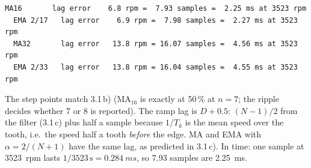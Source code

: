 \begin{solution}
\begin{lstlisting}[style=shell,numbers=none]
  MA16       lag error    6.8 rpm =  7.93 samples =  2.25 ms at 3523 rpm
  EMA 2/17   lag error    6.9 rpm =  7.98 samples =  2.27 ms at 3523 rpm
  MA32       lag error   13.8 rpm = 16.07 samples =  4.56 ms at 3523 rpm
  EMA 2/33   lag error   13.8 rpm = 16.04 samples =  4.55 ms at 3523 rpm
\end{lstlisting}
The step points match 3.1\,b) (MA$_{16}$ is exactly at 50\,\% at $n=7$; the
ripple decides whether 7 or 8 is reported). The ramp lag is
$D+0.5$: $(N-1)/2$ from the filter (3.1\,c) plus half a sample because $1/T_k$
is the mean speed over the tooth, i.e.\ the speed half a tooth \emph{before}
the edge. MA and EMA with $\alpha=2/(N+1)$ have the same lag, as predicted in
3.1\,c). In time: one sample at \SI{3523}{rpm} lasts $1/3523\,\mathrm{s}=\SI{0.284}{ms}$,
so 7.93 samples are \SI{2.25}{ms}.


\end{solution}
